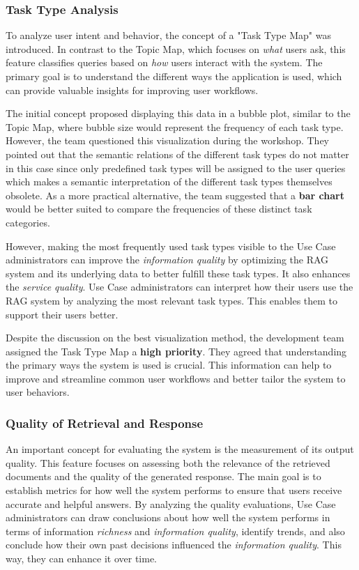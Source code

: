 \documentclass[
	english,
	ruledheaders=section,%
	class=report,%
	thesis={type=bachelor},%
	accentcolor=1b,%
	custommargins=true,%
	marginpar=false,%
	parskip=half-,%
	fontsize=11pt,%
	DIV=14,
]{tudapub}
\begin{document}
\subsubsection{Task Type Analysis}
To analyze user intent and behavior, the concept of a "Task Type Map" was introduced. In contrast to the Topic Map, which focuses on \textit{what} users ask, this feature classifies queries based on \textit{how} users interact with the system. The primary goal is to understand the different ways the application is used, which can provide valuable insights for improving user workflows.

The initial concept proposed displaying this data in a bubble plot, similar to the Topic Map, where bubble size would represent the frequency of each task type. However, the team questioned this visualization during the workshop. They pointed out that the semantic relations of the different task types do not matter in this case since only predefined task types will be assigned to the user queries which makes a semantic interpretation of the different task types themselves obsolete. As a more practical alternative, the team suggested that a \textbf{bar chart} would be better suited to compare the frequencies of these distinct task categories.

However, making the most frequently used task types visible to the Use Case administrators can improve the \textit{information quality} by optimizing the RAG system and its underlying data to better fulfill these task types. It also enhances the \textit{service quality}. Use Case administrators can interpret how their users use the RAG system by analyzing the most relevant task types. This enables them to support their users better.

Despite the discussion on the best visualization method, the development team assigned the Task Type Map a \textbf{high priority}. They agreed that understanding the primary ways the system is used is crucial. This information can help to improve and streamline common user workflows and better tailor the system to user behaviors.
\subsubsection{Quality of Retrieval and Response}
An important concept for evaluating the system is the measurement of its output quality. This feature focuses on assessing both the relevance of the retrieved documents and the quality of the generated response. The main goal is to establish metrics for how well the system performs to ensure that users receive accurate and helpful answers. By analyzing the quality evaluations, Use Case administrators can draw conclusions about how well the system performs in terms of information \textit{richness} and \textit{information quality}, identify trends, and also conclude how their own past decisions influenced the \textit{information quality}. This way, they can enhance it over time.
\end{document}
